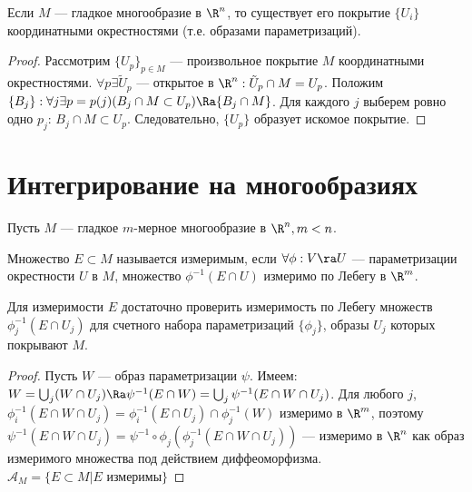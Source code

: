 \begin{lemma}
    Если \(M\) --- гладкое многообразие в \(\R^n\), то существует его покрытие \(\{U_i\}\) координатными окрестностями (т.е. образами параметризаций).
\end{lemma}
\begin{proof}
    Рассмотрим \(\{U_p\}_{p \in M}\) --- произвольное покрытие \(M\) координатными окрестностями. \(\forall p \exists \tilde{U}_p\) --- открытое в \(\R^n: \tilde{U}_p \cap M = U_p\). Положим \(\{B_j\}: \forall j \exists p = p(j) (B_j \cap M \subset U_p) \Ra \{B_j \cap M\}\). Для каждого \(j\) выберем ровно одно \(p_j\): \(B_j \cap M \subset U_p\). Следовательно, \(\{U_p\}\) образует искомое покрытие.
\end{proof}

\section{Интегрирование на многообразиях}
Пусть \(M\) --- гладкое \(m\)-мерное многообразие в \(\R^n, m < n\).

\begin{definition}
    Множество \(E \subset M\) называется измеримым, если \(\forall \phi: V \ra U\) --- параметризации окрестности \(U\) в \(M\), множество \(\phi^{-1}(E \cap U)\) измеримо по Лебегу в \(\R^m\).
\end{definition}
\begin{note}
    Для измеримости \(E\) достаточно проверить измеримость по Лебегу множеств \(\phi_j^{-1}(E \cap U_j)\) для счетного набора параметризаций \(\{\phi_j\}\), образы \(U_j\) которых покрывают \(M\).
\end{note}
\begin{proof}
    Пусть \(W\) --- образ параметризации \(\psi\). Имеем: \(W = \bigcup_{j} (W \cap U_j) \Ra \psi^{-1}(E \cap W) = \bigcup_{j} \psi^{-1}(E \cap W \cap U_j)\). Для любого \(j\), \(\phi^{-1}_i(E \cap W \cap U_j) = \phi_i^{-1}(E \cap U_j) \cap \phi^{-1}_j(W)\) измеримо в \(\R^m\), поэтому \(\psi^{-1}(E \cap W \cap U_j) = \psi^{-1} \circ \phi_j(\phi_j^{-1}(E \cap W \cap U_j))\) --- измеримо в \(\R^n\) как образ измеримого множества под действием диффеоморфизма. \(\mathcal{A}_M = \{E \subset M | E\text{ измеримы}\}\)
\end{proof}


